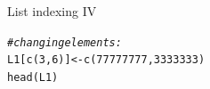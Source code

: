 \documentclass[xcolor=table,           xcolor=dvipsnames]{beamer}\usepackage[]{graphicx}\usepackage[]{color}
\makeatletter
\newcommand{\hlnum}[1]{\textcolor[rgb]{0,0,0}{#1}}
\newcommand{\hlcom}[1]{\textcolor[rgb]{0,0.392,0}{\textit{#1}}}
\newcommand{\hlstd}[1]{\textcolor[rgb]{0,0,0}{#1}}
\newcommand{\hlkwb}[1]{\textcolor[rgb]{0,0,0}{#1}}
\newcommand{\hlkwd}[1]{\textcolor[rgb]{0,0,1}{#1}}
\newenvironment{kframe}{%
 \def\at@end@of@kframe{}%
 \ifinner\ifhmode%
  \def\at@end@of@kframe{\end{minipage}}%
  \begin{minipage}{\columnwidth}%
 \fi\fi%
 \def\FrameCommand##1{\hskip\@totalleftmargin \hskip-\fboxsep
 \colorbox{shadecolor}{##1}\hskip-\fboxsep
     \hskip-\linewidth \hskip-\@totalleftmargin \hskip\columnwidth}%
 \MakeFramed {\advance\hsize-\width
   \@totalleftmargin\z@ \linewidth\hsize
   \@setminipage}}%
 {\par\unskip\endMakeFramed%
 \at@end@of@kframe}
\newenvironment{knitrout}{}{} %
\makeatother
\begin{document}

\begin{frame}[fragile]{List indexing IV}
\begin{knitrout}
\color{fgcolor}\begin{kframe}
\begin{alltt}
\hlcom{# changing elements:}
\hlstd{L1[}\hlkwd{c}\hlstd{(}\hlnum{3}\hlstd{,}\hlnum{6}\hlstd{)]}  \hlkwb{<-} \hlkwd{c}\hlstd{(}\hlnum{77777777}\hlstd{,} \hlnum{3333333}\hlstd{)}
\hlkwd{head}\hlstd{(L1)}
\end{alltt}
\end{kframe}
\end{knitrout}
\end{frame}

\end{document}
